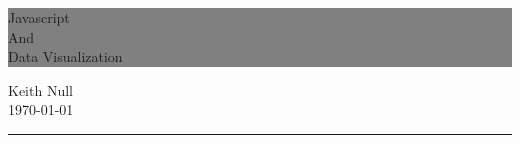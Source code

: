 \begin{titlepage} %


	\colorbox{grey}{
		\parbox[t]{0.93\textwidth}{ %
			\parbox[t]{0.91\textwidth}{ %
				\raggedleft %
				\fontsize{50pt}{80pt}\selectfont %
				\vspace{0.7cm} %

				Javascript\\
				And\\
				Data Visualization\\

				\vspace{0.7cm} %
			}
		}
	}

	\vfill %


	\parbox[t]{0.93\textwidth}{ %
		\raggedleft %
		\large %
		{\Large Keith Null}\\[4pt] %
		\today\\

		\hfill\rule{0.2\linewidth}{1pt}%
	}

\end{titlepage}



